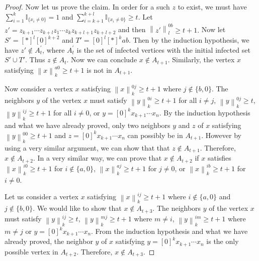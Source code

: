 \documentclass[reqno,11pt]{amsart}
\renewcommand{\geq}{\geqslant}
\begin{document}
\begin{proof}
Now let us prove the claim. In order for a such $z$ to exist, we must have 
$\sum_{i=1}^k\mathbb{I}_{\{x_i \neq 0\}}=1$ and $\sum_{i=k+1}^{k+l}\mathbb{I}_{\{x_i \neq 0\}}\geq t$. Let $z'=z_{k+1} \cdots z_{k+l}z_1\cdots z_k z_{k+l+1}z_{k+l+2}$ and then $\left \lVert z' \right \rVert_l^{0b} \geq t+1.$ Now let $S'=[\ast]^l[0]^{k+2}$ and $T'=[0]^l[\ast]^kab$. Then by the induction hypothesis, we have $z' \notin A_t^{'}$, where $A^{'}_t$ is the set of infected vertices with the initial infected set $S' \cup T'$. Thus $z \notin A_t$. Now we can conclude $x \notin A_{t+1}$. Similarly, the vertex $x$ satisfying $\left \lVert x \right \rVert_k^{a0} \geq t+1$ is not in $A_{t+1}$. 

Now consider a vertex $x$ satisfying $\left \lVert x \right \rVert_k^{0j} \geq t+1$ where $j \notin \{b,0\}$. The neighbors $y$ of the vertex $x$ must satisfy 
$\left \lVert y \right \rVert_k^{0i} \geq t+1$ for all $i \neq j$, $\left \lVert y \right \rVert_k^{0j} \geq t$, $\left \lVert y \right \rVert_k^{ij} \geq t+1$ for all $i \neq 0$, or $y=[0]^kx_{k+1}\cdots x_{n}$. By the induction hypothesis and what we have already proved, only two neighbors $y$ and $z$ of $x$ satisfying $\left \lVert y \right \rVert_k^{00} \geq t+1$ and $z=[0]^kx_{k+1}\cdots x_{n}$ can possibly be in $A_{t+1}$. However by using a very similar argument, we can show that that $z \notin A_{t+1}$. Therefore, $x \notin A_{t+2}$. In a very similar way, we can prove that $x \notin A_{t+2}$ if $x$ satisfies $\left \lVert x \right \rVert_k^{i0} \geq t+1$ for $i \notin \{a,0\}$,
$\left \lVert x \right \rVert_k^{aj} \geq t+1$ for $j \neq 0$, or $\left \lVert x \right \rVert_k^{ib} \geq t+1$ for $i \neq 0$.

Let us consider a vertex $x$ satisfying $\left \lVert x \right \rVert_k^{ij} \geq t+1$ where $i \notin \{a,0\}$ and $j \notin \{b,0\}$. We would like to show that $ x \notin A_{t+3}$. The neighbors $y$ of the vertex $x$ must satisfy $\left \lVert y \right \rVert_k^{ij} \geq t$, $\left \lVert y \right \rVert_k^{mj} \geq t+1$ where $m \neq i$, $\left \lVert y \right \rVert_k^{im} \geq t+1$ where $m \neq j$ or $y=[0]^kx_{k+1}\cdots x_{n}$. From the induction hypothesis and what we have already proved, the neighbor $y$ of $x$ satisfying $y=[0]^kx_{k+1}\cdots x_{n}$ is the only  possible vertex in $A_{t+2}$. Therefore, $x \notin A_{t+3}$. 
\end{proof}
\end{document}

